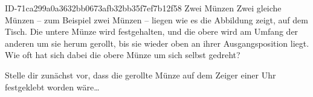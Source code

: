 \begin{exercise}
      {ID-71ca299a0a3632bb0673afb32bb35f7ef7b12f58}
      {Zwei Münzen}
  \ifproblem\problem
    Zwei gleiche Münzen -- zum Beispiel zwei  Münzen -- liegen wie es
    die Abbildung zeigt, auf dem Tisch. Die untere Münze wird festgehalten, und die
    obere wird am Umfang der anderen um sie herum gerollt, bis sie wieder oben an
    ihrer Ausgangsposition liegt. Wie oft hat sich dabei die obere Münze um sich
    selbst gedreht?
    \begin{center}
    \end{center}
  \fi
  \ifoutline\outline
    Stelle dir zunächst vor, dass die gerollte Münze auf dem Zeiger einer Uhr
    festgeklebt worden wäre\ldots
  \fi
\end{exercise}
